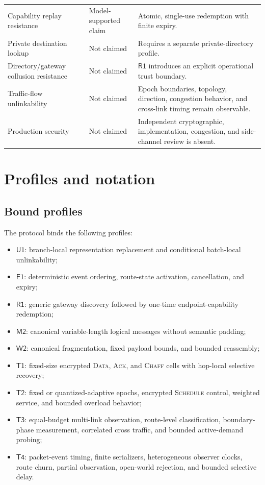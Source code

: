 \documentclass[11pt,oneside]{article}
\newcommand{\Uone}{\ensuremath{\mathsf{U1}}}
\newcommand{\Eone}{\ensuremath{\mathsf{E1}}}
\newcommand{\Rone}{\ensuremath{\mathsf{R1}}}
\newcommand{\Mtwo}{\ensuremath{\mathsf{M2}}}
\newcommand{\Wtwo}{\ensuremath{\mathsf{W2}}}
\newcommand{\Tone}{\ensuremath{\mathsf{T1}}}
\newcommand{\Ttwo}{\ensuremath{\mathsf{T2}}}
\newcommand{\Tthree}{\ensuremath{\mathsf{T3}}}
\newcommand{\Tfour}{\ensuremath{\mathsf{T4}}}
\begin{document}
\begin{table}[ht]
\begin{tabularx}{\textwidth}{@{}p{}p{}X@{}}
Capability replay resistance & Model-supported claim & Atomic, single-use redemption with finite expiry. \\
Private destination lookup & Not claimed & Requires a separate private-directory profile. \\
Directory/gateway collusion resistance & Not claimed & \Rone{} introduces an explicit operational trust boundary. \\
Traffic-flow unlinkability & Not claimed & Epoch boundaries, topology, direction, congestion behavior, and cross-link timing remain observable. \\
Production security & Not claimed & Independent cryptographic, implementation, congestion, and side-channel review is absent. \\
\bottomrule
\end{tabularx}
\end{table}
\FloatBarrier

\section{Profiles and notation}
\label{sec:notation}

\subsection{Bound profiles}

The protocol binds the following profiles:

\begin{itemize}
  \item \Uone{}: branch-local representation replacement and conditional batch-local unlinkability;
  \item \Eone{}: deterministic event ordering, route-state activation, cancellation, and expiry;
  \item \Rone{}: generic gateway discovery followed by one-time endpoint-capability redemption;
  \item \Mtwo{}: canonical variable-length logical messages without semantic padding;
  \item \Wtwo{}: canonical fragmentation, fixed payload bounds, and bounded reassembly;
  \item \Tone{}: fixed-size encrypted \textsc{Data}, \textsc{Ack}, and \textsc{Chaff} cells with hop-local selective recovery;
  \item \Ttwo{}: fixed or quantized-adaptive epochs, encrypted \textsc{Schedule} control, weighted service, and bounded overload behavior;
  \item \Tthree{}: equal-budget multi-link observation, route-level classification, boundary-phase measurement, correlated cross traffic, and bounded active-demand probing;
  \item \Tfour{}: packet-event timing, finite serializers, heterogeneous observer clocks, route churn, partial observation, open-world rejection, and bounded selective delay.
\end{itemize}
\end{document}
